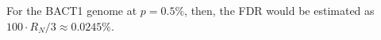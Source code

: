 For the BACT1 genome at $p = 0.5\%$, then, the FDR would be estimated as $100 \cdot R_N / 3 \approx 0.0245\%$.\endinput